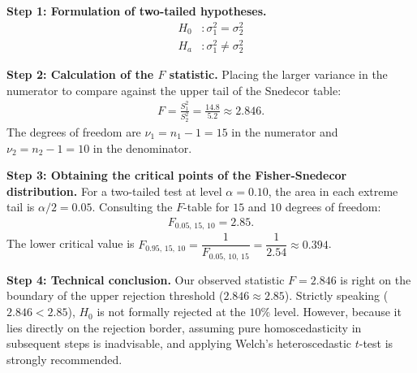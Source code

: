 \begin{solucion}
	\textbf{Step 1: Formulation of two-tailed hypotheses.}
	\begin{align}
		H_0&: \sigma_1^2 = \sigma_2^2 \\
		H_a&: \sigma_1^2 \neq \sigma_2^2
	\end{align}
	
	\textbf{Step 2: Calculation of the $F$ statistic.}
	Placing the larger variance in the numerator to compare against the upper tail of the Snedecor table:
	\begin{align}
		F = \frac{S_1^2}{S_2^2} = \frac{14.8}{5.2} \approx 2.846.
	\end{align}
	The degrees of freedom are $\nu_1 = n_1 - 1 = 15$ in the numerator and $\nu_2 = n_2 - 1 = 10$ in the denominator.
	
	\textbf{Step 3: Obtaining the critical points of the Fisher-Snedecor distribution.}
	For a two-tailed test at level $\alpha = 0.10$, the area in each extreme tail is $\alpha/2 = 0.05$. Consulting the $F$-table for $15$ and $10$ degrees of freedom:
	\begin{align}
		F_{0.05, \, 15, \, 10} = 2.85.
	\end{align}
	The lower critical value is $F_{0.95, \, 15, \, 10} = \dfrac{1}{F_{0.05, \, 10, \, 15}} = \dfrac{1}{2.54} \approx 0.394$.
	
	\textbf{Step 4: Technical conclusion.}
	Our observed statistic $F = 2.846$ is right on the boundary of the upper rejection threshold ($2.846 \approx 2.85$). Strictly speaking ($2.846 < 2.85$), $H_0$ is not formally rejected at the $10\%$ level. However, because it lies directly on the rejection border, assuming pure homoscedasticity in subsequent steps is inadvisable, and applying Welch's heteroscedastic $t$-test is strongly recommended.
\end{solucion}

